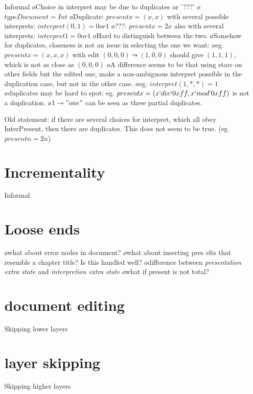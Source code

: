 Informal
\bl
\o Choice in interpret may be due to duplicates or '???'
\o $type Document = Int$ 
\o Duplicate: $present x = (x,x)$ with several possible interprets: $interpret (0,1) = 0 or 1$ 
\o ???: $present x = 2x$ also with several interprets: $interpret 1 = 0 or 1$ 
\o Hard to distinguish between the two.
\o Somehow for duplicates, closeness is not an issue in selecting the one we want:
\o eg. $present x = (x,x,x)$ with edit $(0,0,0)\leadsto(1,0,0)$ should give $(1,1,1)$, which is not as close as $(0,0,0)$
\o A difference seems to be that using stars on other fields but the edited one, make a non-ambiguous interpret possible in the duplication case, but not in the other case.
\o eg. $interpret (1,*,*) = 1$
\o duplicates may be hard to spot: eg. $present x = (x `div` 0xff, x `mod` 0xff)$ is not a duplication.
\o $1 \to "one"$ can be seen as three partial duplicates. 
\el

Old statement: if there are several choices for interpret, which all obey {\sc InterPresent}, then there are duplicates. This does not seem to be true. (eg. $present n = 2n$)

%																
%																
%																
\section{Incrementality}
Informal


%																
%																
%																
\section{Loose ends}
\bl
\o what about error nodes in document?
\o what about inserting pres elts that resemble a chapter title? Is this handled well?
\o difference between {\em presentation extra state} and {\em interpretion extra state}
\o what if present is not total?
\el


%																
%																
%																
\section{document editing}
Skipping lower layers



%																
%																
%																
\section{layer skipping}
Skipping higher layers

\renewcommand{\present}[0]{{\tt present}}					%
\renewcommand{\interpret}[0]{{\tt interpret}}				%
\renewcommand{\Core}[0]{\ensuremath{\mathit{Core}}}	%
                                 